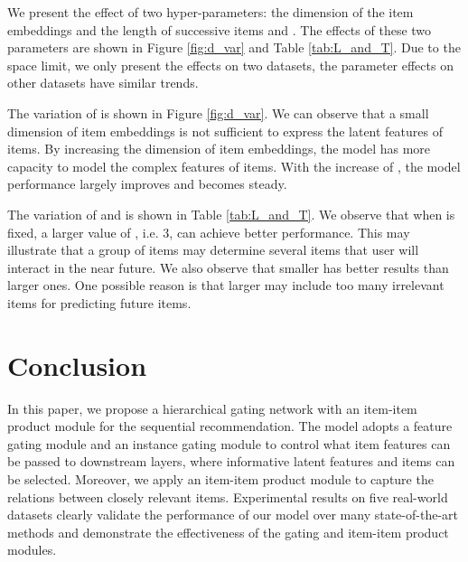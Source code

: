\documentclass[sigconf]{acmart}
\begin{document}
We present the effect of two hyper-parameters: the dimension of the item embeddings  and the length of successive items  and . The effects of these two parameters are shown in Figure \ref{fig:d_var} and Table \ref{tab:L_and_T}. Due to the space limit, we only present the effects on two datasets, the parameter effects on other datasets have similar trends.

The variation of  is shown in Figure \ref{fig:d_var}. We can observe that a small dimension of item embeddings is not sufficient to express the latent features of items. By increasing the dimension of item embeddings, the model has more capacity to model the complex features of items. With the increase of , the model performance largely improves and becomes steady.

The variation of  and  is shown in Table \ref{tab:L_and_T}. We observe that when  is fixed, a larger value of , i.e. 3, can achieve better performance. This may illustrate that a group of  items may determine several items that user will interact in the near future. We also observe that smaller  has better results than larger ones. One possible reason is that larger  may include too many irrelevant items for predicting future items. 
\section{Conclusion}
In this paper, we propose a hierarchical gating network with an item-item product module for the sequential recommendation. The model adopts a feature gating module and an instance gating module to control what item features can be passed to downstream layers, where informative latent features and items can be selected. Moreover, we apply an item-item product module to capture the relations between closely relevant items. Experimental results on five real-world datasets clearly validate the performance of our model over many state-of-the-art methods and demonstrate the effectiveness of the gating and item-item product modules. 


 
\end{document}
